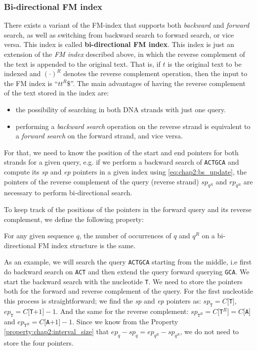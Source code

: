 \subsubsection{Bi-directional FM index}
There exists a variant of the FM-index that supports both {\em
 backward} and {\em forward} search, as well as switching from
backward search to forward search, or vice versa. This index is 
called {\bf bi-directional FM index}. This index is just an extension
of the {\em FM index} described above, in which the reverse complement
of the text is appended to the original text. That is, if $t$ is the
original text to be indexed and $({\cdot})^R$ denotes the reverse
complement operation, then the input to the FM index is
``$tt^R\$$''. The main advantages of having the reverse complement
of the text stored in the index are:
\begin{itemize}
\item the possibility of searching
in both DNA strands with just one query.
\item performing a {\em backward search} operation on the reverse
  strand is equivalent to a {\em forward search} on the forward
  strand, and vice versa.
\end{itemize}
For that, we need to know the position of the start and end pointers
for both strands for a given query, e.g. if we perform a backward
search of \texttt{ACTGCA} and compute its {\em sp} and {\em ep}
pointers in a given index using \eqref{eq:chap2:bs_update}, the
pointers of the reverse complement of the query (reverse strand)
$sp_{q^R}$ and $rp_{q^R}$ are necessary to perform bi-directional search.

To keep track of the positions of the pointers in the forward query
and its reverse complement, we define the following property: 
\begin{property}
  \label{property:chap2:interval_size}
  For any given sequence $q$, the number of occurrences of $q$ and
  $q^R$ on a bi-directional FM index structure is the same.
\end{property}

As an example, we will search the query \texttt{ACTGCA} starting
from the middle, i.e first do backward search on \texttt{ACT} and then
extend the query forward querying \texttt{GCA}. We start the
backward search with the nucleotide \texttt{T}. We need to store the
pointers both for the forward and reverse complement of the query. For
the first nucleotide this process is straightforward; we find the {\em
  sp} and {\em ep} pointers as: $sp_{\texttt{T}} = C[$\texttt{T}$]$,
$ep_{\texttt{T}} = C[$\texttt{T}$+1]-1$. And the same for the reverse
complement: $sp_{\texttt{T}^R}=C[$\texttt{T}$^R]=C[$\texttt{A}$]$ and
$ep_{\texttt{T}^R}=C[$\texttt{A}$+1]-1$. Since we know from the
Property \ref{property:chap2:interval_size} that
$ep_q-sp_q=ep_{q^R}-sp_{q^R}$, we do not need to store the four
pointers. 

